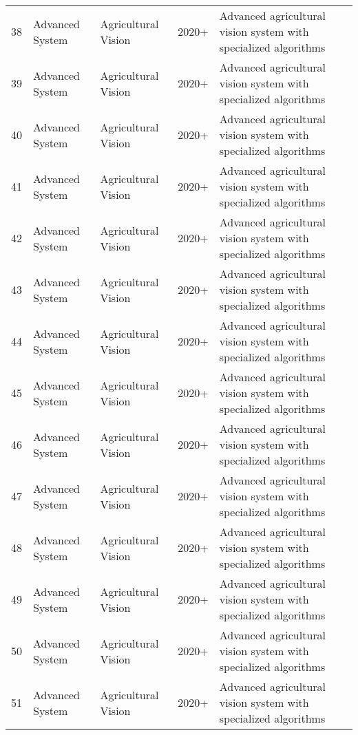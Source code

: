 \begin{table*}[htbp]
\begin{tabular}{p{}p{}p{}p{}p{}p{}}
 38 & Advanced System & Agricultural Vision & 2020+ & Advanced agricultural vision system with specialized algorithms & \cite{liu2016method} \\
 39 & Advanced System & Agricultural Vision & 2020+ & Advanced agricultural vision system with specialized algorithms & \cite{mehta2014vision} \\
 40 & Advanced System & Agricultural Vision & 2020+ & Advanced agricultural vision system with specialized algorithms & \cite{nguyen2016detection} \\
 41 & Advanced System & Agricultural Vision & 2020+ & Advanced agricultural vision system with specialized algorithms & \cite{pereira2019deep} \\
 42 & Advanced System & Agricultural Vision & 2020+ & Advanced agricultural vision system with specialized algorithms & \cite{kang2019fruit} \\
 43 & Advanced System & Agricultural Vision & 2020+ & Advanced agricultural vision system with specialized algorithms & \cite{gongal2018apple} \\
 44 & Advanced System & Agricultural Vision & 2020+ & Advanced agricultural vision system with specialized algorithms & \cite{gene2019fruit} \\
 45 & Advanced System & Agricultural Vision & 2020+ & Advanced agricultural vision system with specialized algorithms & \cite{pourdarbani2020automatic} \\
 46 & Advanced System & Agricultural Vision & 2020+ & Advanced agricultural vision system with specialized algorithms & \cite{girshick2014rcnn} \\
 47 & Advanced System & Agricultural Vision & 2020+ & Advanced agricultural vision system with specialized algorithms & \cite{ren2015faster} \\
 48 & Advanced System & Agricultural Vision & 2020+ & Advanced agricultural vision system with specialized algorithms & \cite{chen2024deep} \\
 49 & Advanced System & Agricultural Vision & 2020+ & Advanced agricultural vision system with specialized algorithms & \cite{cai2018cascade} \\
 50 & Advanced System & Agricultural Vision & 2020+ & Advanced agricultural vision system with specialized algorithms & \cite{he2017mask} \\
 51 & Advanced System & Agricultural Vision & 2020+ & Advanced agricultural vision system with specialized algorithms & \cite{qiao2021detectors} \\

\end{tabular}
\end{table*}
